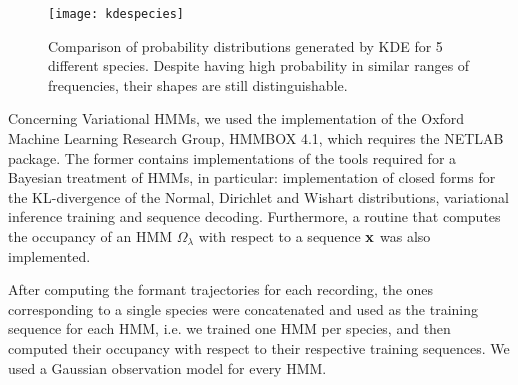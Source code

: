 \documentclass[../main.tex]{subfiles}
\begin{document}
\begin{figure}[t]
\centering
\texttt{[image: kdespecies]}
\caption{Comparison of probability distributions generated by KDE for 5 different species. Despite having high probability in similar ranges of frequencies, their shapes are still distinguishable. }
\label{fig_kdespecies}
\end{figure}

\par Concerning Variational HMMs, we used the implementation of the Oxford Machine Learning Research Group, HMMBOX 4.1, which requires the NETLAB package. The former contains implementations of the tools required for a Bayesian treatment of HMMs, in particular: implementation of closed forms for the KL-divergence of the Normal, Dirichlet and Wishart distributions, variational inference training and sequence decoding. Furthermore, a routine that computes the occupancy of an HMM $\Omega_\lambda$ with respect to a sequence $\mathbf{x}$ was also implemented. 
\par After computing the formant trajectories for each recording, the ones corresponding to a single species were concatenated and used as the training sequence for each HMM, i.e. we trained one HMM per species, and then computed their occupancy with respect to their respective training sequences. We used a Gaussian observation model for every HMM.
\end{document}
